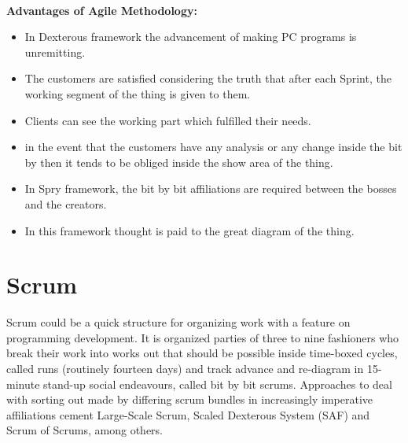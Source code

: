 \documentclass[oneside,12pt]{Classes/VTU}
\begin{document}
    	\paragraph{}
    	\textbf{Advantages of Agile Methodology:}
    	\begin{itemize}
    		\item In Dexterous framework the advancement of making PC programs is unremitting. 
    		\item The customers are satisfied considering the truth that after each Sprint, the working segment of the thing is given to them. 
    		\item Clients can see the working part which fulfilled their needs. 
    		\item in the event that the customers have any analysis or any change inside the bit by then it tends to be obliged inside the show area of the thing. 
    		\item In Spry framework, the bit by bit affiliations are required between the bosses and the creators. 
    		\item In this framework thought is paid to the great diagram of the thing.
    	\end{itemize}
    	
    	
    	
    	\section{Scrum}
    	Scrum could be a quick structure for organizing work with a feature on programming development. It is organized parties of three to nine fashioners who break their work into works out that should be possible inside time-boxed cycles, called runs (routinely fourteen days) and track advance and re-diagram in 15-minute stand-up social endeavours, called bit by bit scrums. Approaches to deal with sorting out made by differing scrum bundles in increasingly imperative affiliations cement Large-Scale Scrum, Scaled Dexterous System (SAF) and Scrum of Scrums, among others.
\end{document}
